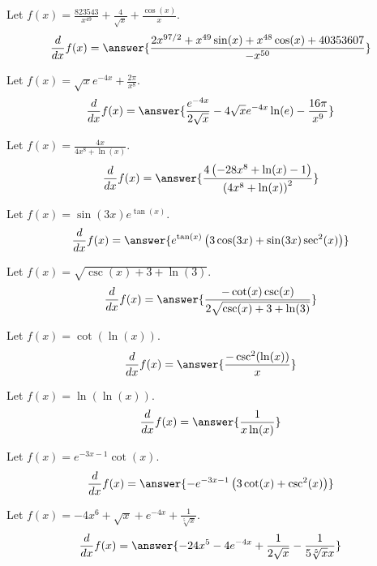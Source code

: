 \documentclass{ximera}
\begin{document}
\begin{shuffle}
\begin{exercise}
Let $f(x)=\frac{823543}{x^{49}}+\frac{4}{\sqrt{x}}+\frac{\cos (x)}{x}$.
\[
\ddx f(x) = \answer{\frac{2 x^{97/2}+x^{49} \sin (x)+x^{48} \cos (x)+40353607}{-x^{50}}}
\]
\end{exercise}

\begin{exercise}
Let $f(x)=\sqrt{x} e^{-4 x}+\frac{2 \pi }{x^8}$.
\[
\ddx f(x) = \answer{\frac{e^{-4 x}}{2 \sqrt{x}}-4 \sqrt{x} e^{-4 x} \ln (e)-\frac{16 \pi }{x^9}}
\]
\end{exercise}

\begin{exercise}
Let $f(x)=\frac{4 x}{4 x^8+\ln (x)}$.
\[
\ddx f(x) = \answer{\frac{4 \left(-28 x^8+\ln (x)-1\right)}{\left(4 x^8+\ln (x)\right)^2}}
\]
\end{exercise}

\begin{exercise}
Let $f(x)=\sin (3 x) e^{\tan (x)}$.
\[
\ddx f(x) = \answer{e^{\tan (x)} \left(3 \cos (3 x)+\sin (3 x) \sec ^2(x)\right)}
\]
\end{exercise}

\begin{exercise}
Let $f(x)=\sqrt{\csc (x)+3+\ln (3)}$.
\[
\ddx f(x) = \answer{\frac{-\cot (x) \csc (x)}{2 \sqrt{\csc (x)+3+\ln (3)}}}
\]
\end{exercise}

\begin{exercise}
Let $f(x)=\cot (\ln (x))$.
\[
\ddx f(x) = \answer{\frac{-\csc ^2(\ln (x))}{x}}
\]
\end{exercise}

\begin{exercise}
Let $f(x)=\ln (\ln (x))$.
\[
\ddx f(x) = \answer{\frac{1}{x \ln (x)}}
\]
\end{exercise}

\begin{exercise}
Let $f(x)=e^{-3 x-1} \cot (x)$.
\[
\ddx f(x) = \answer{-e^{-3 x-1} \left(3 \cot (x)+\csc ^2(x)\right)}
\]
\end{exercise}

\begin{exercise}
Let $f(x)=-4 x^6+\sqrt{x}+e^{-4 x}+\frac{1}{\sqrt[5]{x}}$.
\[
\ddx f(x) = \answer{-24 x^5-4 e^{-4 x}+\frac{1}{2 \sqrt{x}}-\frac{1}{5 \sqrt[5]{x} x}}
\]
\end{exercise}



\end{shuffle}
\end{document}
